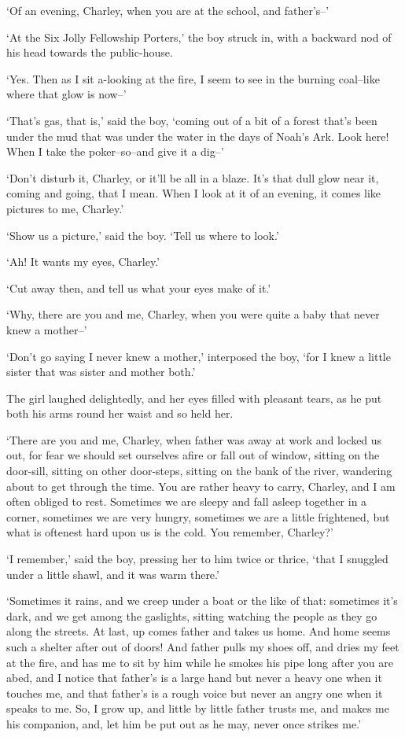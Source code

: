 ‘Of an evening, Charley, when you are at the school, and father’s--’

‘At the Six Jolly Fellowship Porters,’ the boy struck in, with a
backward nod of his head towards the public-house.

‘Yes. Then as I sit a-looking at the fire, I seem to see in the burning
coal--like where that glow is now--’

‘That’s gas, that is,’ said the boy, ‘coming out of a bit of a forest
that’s been under the mud that was under the water in the days of Noah’s
Ark. Look here! When I take the poker--so--and give it a dig--’

‘Don’t disturb it, Charley, or it’ll be all in a blaze. It’s that dull
glow near it, coming and going, that I mean. When I look at it of an
evening, it comes like pictures to me, Charley.’

‘Show us a picture,’ said the boy. ‘Tell us where to look.’

‘Ah! It wants my eyes, Charley.’

‘Cut away then, and tell us what your eyes make of it.’

‘Why, there are you and me, Charley, when you were quite a baby that
never knew a mother--’

‘Don’t go saying I never knew a mother,’ interposed the boy, ‘for I knew
a little sister that was sister and mother both.’

The girl laughed delightedly, and her eyes filled with pleasant tears,
as he put both his arms round her waist and so held her.

‘There are you and me, Charley, when father was away at work and locked
us out, for fear we should set ourselves afire or fall out of window,
sitting on the door-sill, sitting on other door-steps, sitting on the
bank of the river, wandering about to get through the time. You
are rather heavy to carry, Charley, and I am often obliged to rest.
Sometimes we are sleepy and fall asleep together in a corner, sometimes
we are very hungry, sometimes we are a little frightened, but what is
oftenest hard upon us is the cold. You remember, Charley?’

‘I remember,’ said the boy, pressing her to him twice or thrice, ‘that I
snuggled under a little shawl, and it was warm there.’

‘Sometimes it rains, and we creep under a boat or the like of that:
sometimes it’s dark, and we get among the gaslights, sitting watching
the people as they go along the streets. At last, up comes father and
takes us home. And home seems such a shelter after out of doors! And
father pulls my shoes off, and dries my feet at the fire, and has me
to sit by him while he smokes his pipe long after you are abed, and
I notice that father’s is a large hand but never a heavy one when it
touches me, and that father’s is a rough voice but never an angry one
when it speaks to me. So, I grow up, and little by little father trusts
me, and makes me his companion, and, let him be put out as he may, never
once strikes me.’

